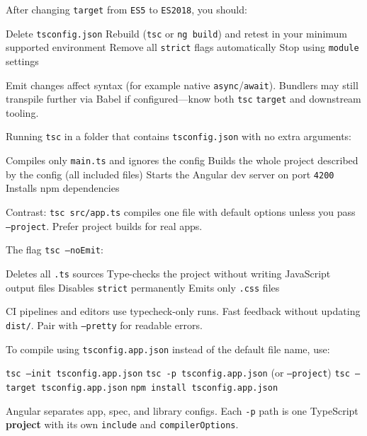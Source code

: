\question[4]
After changing \texttt{target} from \texttt{ES5} to \texttt{ES2018}, you should:
\begin{choices}
  \choice Delete \texttt{tsconfig.json}
  \CorrectChoice Rebuild (\texttt{tsc} or \texttt{ng build}) and retest in your minimum supported environment
  \choice Remove all \texttt{strict} flags automatically
  \choice Stop using \texttt{module} settings
\end{choices}
\begin{solution}
  Emit changes affect syntax (for example native \texttt{async}/\texttt{await}). Bundlers may still transpile further via Babel if configured---know both \texttt{tsc} \texttt{target} and downstream tooling.
\end{solution}

\question[4]
Running \texttt{tsc} in a folder that contains \texttt{tsconfig.json} with no extra arguments:
\begin{choices}
  \choice Compiles only \texttt{main.ts} and ignores the config
  \CorrectChoice Builds the whole project described by the config (all included files)
  \choice Starts the Angular dev server on port \texttt{4200}
  \choice Installs npm dependencies
\end{choices}
\begin{solution}
  Contrast: \texttt{tsc src/app.ts} compiles one file with default options unless you pass \texttt{--project}. Prefer project builds for real apps.
\end{solution}

\question[4]
The flag \texttt{tsc --noEmit}:
\begin{choices}
  \choice Deletes all \texttt{.ts} sources
  \CorrectChoice Type-checks the project without writing JavaScript output files
  \choice Disables \texttt{strict} permanently
  \choice Emits only \texttt{.css} files
\end{choices}
\begin{solution}
  CI pipelines and editors use typecheck-only runs. Fast feedback without updating \texttt{dist/}. Pair with \texttt{--pretty} for readable errors.
\end{solution}

\question[4]
To compile using \texttt{tsconfig.app.json} instead of the default file name, use:
\begin{choices}
  \choice \texttt{tsc --init tsconfig.app.json}
  \CorrectChoice \texttt{tsc -p tsconfig.app.json} (or \texttt{--project})
  \choice \texttt{tsc --target tsconfig.app.json}
  \choice \texttt{npm install tsconfig.app.json}
\end{choices}
\begin{solution}
  Angular separates app, spec, and library configs. Each \texttt{-p} path is one TypeScript \textbf{project} with its own \texttt{include} and \texttt{compilerOptions}.
\end{solution}

